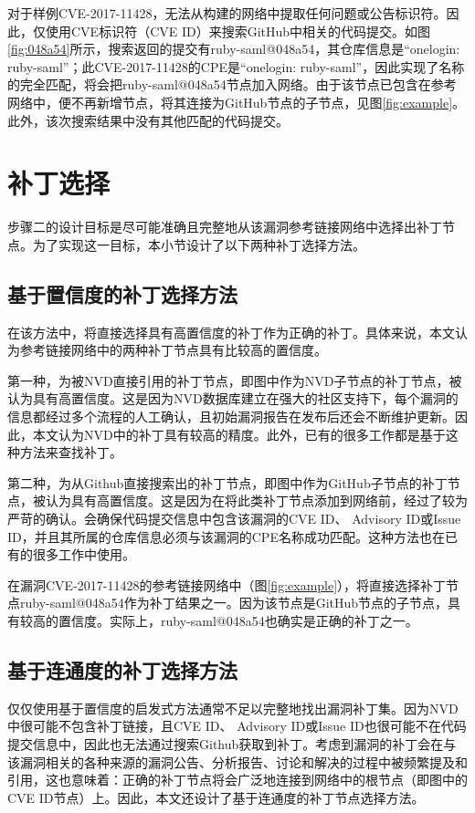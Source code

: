 \begin{exmp}
对于样例CVE-2017-11428，\tool 无法从构建的网络中提取任何问题或公告标识符。因此，\tool 仅使用CVE标识符（CVE ID）来搜索GitHub中相关的代码提交。如图\ref{fig:048a54}所示，搜索返回的提交有ruby-saml@048a54，其仓库信息是“onelogin: ruby-saml”；此CVE-2017-11428的CPE是“onelogin: ruby-saml”，因此实现了名称的完全匹配，\tool 将会把ruby-saml@048a54节点加入网络。由于该节点已包含在参考网络中，\tool 便不再新增节点，将其连接为GitHub节点的子节点，见图\ref{fig:example}。此外，该次搜索结果中没有其他匹配的代码提交。
\end{exmp}   

\section{补丁选择}\label{sec:selection}

步骤二的设计目标是尽可能准确且完整地从该漏洞参考链接网络中选择出补丁节点。为了实现这一目标，本小节设计了以下两种补丁选择方法。

\subsection{基于置信度的补丁选择方法}
在该方法中，\tool 将直接选择具有高置信度的补丁作为正确的补丁。具体来说，本文认为参考链接网络中的两种补丁节点具有比较高的置信度。

第一种，为被NVD直接引用的补丁节点，即图中作为NVD子节点的补丁节点，被认为具有高置信度。这是因为NVD数据库建立在强大的社区支持下，每个漏洞的信息都经过多个流程的人工确认，且初始漏洞报告在发布后还会不断维护更新。因此，本文认为NVD中的补丁具有较高的精度。此外，已有的很多工作\cite{duan2019automating, li2016vulpecker, li2018vuldeepecker}都是基于这种方法来查找补丁。

第二种，为从Github直接搜索出的补丁节点，即图中作为GitHub子节点的补丁节点，被认为具有高置信度。这是因为在将此类补丁节点添加到网络前，经过了较为严苛的确认。\tool 会确保代码提交信息中包含该漏洞的CVE ID、 Advisory ID或Issue ID，并且其所属的仓库信息必须与该漏洞的CPE名称成功匹配。这种方法也在已有的很多工作\cite{you2017semfuzz, Wang2020empirical}中使用。

\begin{exmp}
在漏洞CVE-2017-11428的参考链接网络中（图\ref{fig:example}），\tool 将直接选择补丁节点ruby-saml@048a54作为补丁结果之一。因为该节点是GitHub节点的子节点，具有较高的置信度。实际上，ruby-saml@048a54也确实是正确的补丁之一。
\end{exmp}

\subsection{基于连通度的补丁选择方法}
仅仅使用基于置信度的启发式方法通常不足以完整地找出漏洞补丁集。因为NVD中很可能不包含补丁链接，且CVE ID、 Advisory ID或Issue ID也很可能不在代码提交信息中，因此也无法通过搜索Github获取到补丁。考虑到漏洞的补丁会在与该漏洞相关的各种来源的漏洞公告、分析报告、讨论和解决的过程中被频繁提及和引用，这也意味着：正确的补丁节点将会广泛地连接到网络中的根节点（即图中的CVE ID节点）上。因此，本文还设计了基于连通度的补丁节点选择方法。

